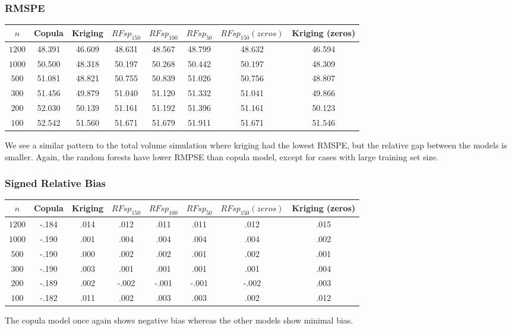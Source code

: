 \documentclass{article}
\begin{document}
\subsubsection{RMSPE}
\begin{center}
\begin{tabular}{|| c | c c c c c c c ||}
\hline
$n$ & Copula & Kriging & $RFsp_{150}$ & $RFsp_{100}$ & $RFsp_{50}$ & $RFsp_{150}(zeros)$ & Kriging (zeros) \\ [.5ex] 
\hline\hline
	$1200$ & 48.391 & 46.609 & 48.631 & 48.567 & 48.799 & 48.632 & 46.594 \\
	$1000$ & 50.500 & 48.318 & 50.197 & 50.268 & 50.442 & 50.197 & 48.309 \\
	$500$ & 51.081 & 48.821 & 50.755 & 50.839 & 51.026 & 50.756 & 48.807 \\
	$300$ & 51.456 & 49.879 & 51.040 & 51.120 & 51.332 & 51.041 & 49.866 \\
	$200$ & 52.030 & 50.139 & 51.161 & 51.192 & 51.396 & 51.161 & 50.123 \\
	$100$ & 52.542 & 51.560 & 51.671 & 51.679 & 51.911 & 51.671 & 51.546 \\ [.5ex] 
\hline
\end{tabular}
\end{center}
We see a similar pattern to the total volume simulation where kriging had the lowest RMSPE, but the relative gap between the models is smaller.
Again, the random forests have lower RMPSE than copula model, except for cases with large training set size.

\subsubsection{Signed Relative Bias}
\begin{center}
\begin{tabular}{|| c | c c c c c c c ||}
\hline
$n$ & Copula & Kriging & $RFsp_{150}$ & $RFsp_{100}$ & $RFsp_{50}$ & $RFsp_{150}(zeros)$ & Kriging (zeros) \\ [.5ex] 
\hline\hline
	$1200$ & -.184 & .014 & .012 & .011 & .011 & .012 & .015 \\
	$1000$ & -.190 & .001 & .004 & .004 & .004 & .004 & .002 \\
	$500$ & -.190 & .000 & .002 & .002 & .001 & .002 & .001 \\
	$300$ & -.190 & .003 & .001 & .001 & .001 & .001 & .004 \\
	$200$ & -.189 & .002 & -.002 & -.001 & -.001 & -.002 & .003 \\
	$100$ & -.182 & .011 & .002 & .003 & .003 & .002 & .012 \\ [.5ex] 
\hline
\end{tabular}
\end{center}
The copula model once again shows negative bias whereas the other models show minimal bias.
\end{document}
